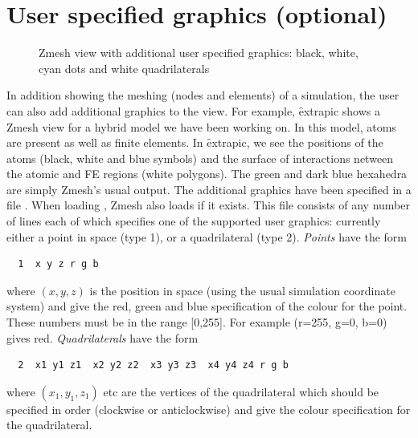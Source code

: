 \documentclass[a4paper,twoside,11pt]{book}
\begin{document}
\section{User specified graphics (optional)}
\label{extra}

\begin{figure}
  \caption{Zmesh view with additional user specified graphics: black,
    white, cyan dots and white quadrilaterals}
  \label{extrapic}
\end{figure}

In addition showing the meshing (nodes and elements) of a simulation,
the user can also add additional graphics to the view. For example,
\f{extrapic} shows a Zmesh view for a hybrid model we have been
working on. In this model, atoms are present as well as finite
elements. In \f{extrapic}, we see the positions of the atoms (black,
white and blue symbols) and the surface of interactions netween the
atomic and FE regions (white polygons). The green and dark blue
hexahedra are simply Zmesh's usual output. The additional graphics
have been specified in a file . When loading
, Zmesh also loads  if it exists. This
file consists of any number of lines each of which specifies one of
the supported user graphics: currently either a point in space (type
1), or a quadrilateral (type 2). \emph{Points} have the form
\begin{verbatim}
  1  x y z r g b
\end{verbatim}
where $(x,y,z)$ is the position in space (using the usual simulation
coordinate system) and  give the red, green and blue
specification of the colour for the point. These numbers must be in
the range [0,255]. For example (r=255, g=0, b=0) gives
red. \emph{Quadrilaterals} have the form
\begin{verbatim}
  2  x1 y1 z1  x2 y2 z2  x3 y3 z3  x4 y4 z4 r g b
\end{verbatim}
where $(x_1,y_1,z_1)$ etc are the vertices of the quadrilateral which
should be specified in order (clockwise or anticlockwise) and
 give the colour specification for the quadrilateral.
\end{document}
